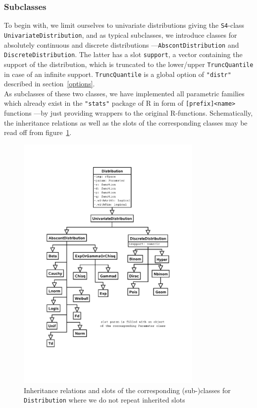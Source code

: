 \documentclass[11pt]{article}
\newcommand{\code}[1]{{\tt #1}}
\newcommand{\pkg}[1]{{\tt "#1"}}
\begin{document}
\subsubsection{Subclasses}
To begin with, we limit ourselves to univariate distributions giving the {\tt S4}-class 
\code{UnivariateDistribution}, and as typical subclasses, we introduce classes for 
absolutely continuous and discrete distributions ---\code{AbscontDistribution} and
\code{DiscreteDistribution}.
The latter has a slot \code{support}, a vector containing the support of the 
distribution, which is truncated to the lower/upper \code{TruncQuantile} in case of 
an infinite support. \code{TruncQuantile} is a global option of  \pkg{distr} described
in section~{\ref{options}}.\\
As subclasses of these two classes, we have implemented all parametric families 
which already exist in the  \pkg{stats} package of {\sf R} in form of 
{\tt [prefix]<name>} functions ---by just providing wrappers to the original 
{\sf R}-functions. Schematically, the inheritance relations as well as the slots of 
the corresponding classes may be read off from figure~\ref{fig1c}.
\ifpdf
\begin{figure}[!ht]\label{fig1}
\vspace{2ex}
  \begin{center}
    \includegraphics[viewport=130 150 500 750,width=9cm]{distribution.pdf}%
    \caption{\label{fig1c}{\footnotesize Inheritance relations and slots of the corresponding \mbox{(sub-)}classes
    for \code{Distribution} where we do not repeat inherited slots
    }}
  \end{center}
\vspace{-4ex}
\end{figure}
\end{document}

